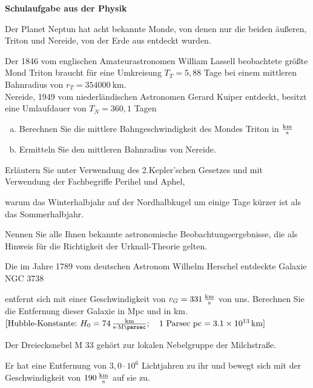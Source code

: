 \documentclass[a4paper]{article}
\begin{document}
{\bf Schulaufgabe aus der Physik }\\
\begin{enumerate}[1.]

{\bf \item Der Planet Neptun hat acht bekannte Monde, von denen nur die beiden äußeren, Triton und Nereide, von der Erde aus entdeckt wurden.} Der 1846 vom englischen Amateurastronomen William Lassell beobachtete größte Mond Triton braucht für eine Umkreisung $T_T=5,88$ Tage bei einem mittleren Bahnradius von $r_T= \SI{354000}{\kilo\meter}$. \\
Nereide, 1949 vom niederländischen Astronomen Gerard Kuiper entdeckt, besitzt eine Umlaufdauer von $T_N=360,1 $ Tagen

\begin{enumerate}[a)]
\item Berechnen Sie die mittlere Bahngeschwindigkeit des Mondes Triton in $\SI{}{\kilo\meter\over \second}$
\item Ermitteln Sie den mittleren Bahnradius von Nereide.
\end{enumerate}

{\bf \item Erläutern Sie unter Verwendung des 2.Kepler'schen Gesetzes und mit Verwendung der Fachbegriffe Perihel und Aphel,}  warum das Winterhalbjahr auf der Nordhalbkugel um einige Tage kürzer ist als das Sommerhalbjahr.

{\bf \item Nennen Sie alle Ihnen bekannte astronomische Beobachtungsergebnisse, die als Hinweis für die Richtigkeit der Urknall-Theorie gelten.}

{\bf \item Die im Jahre 1789 vom deutschen Astronom Wilhelm Herschel entdeckte Galaxie NGC 3738} entfernt sich mit einer Geschwindigkeit von $v_G=\SI{331}{\kilo\meter\over \second}$ von uns. Berechnen Sie die Entfernung dieser Galaxie in Mpc und in km.\\
$[\textnormal{Hubble-Konstante:}~H_0=\SI{74}{\kilo\meter\over \second\cdot\mega\parsec}; \quad 1~\textnormal{Parsec~pc}=\SI{3,1e13}{\kilo\meter}]$

{\bf \item Der Dreiecksnebel M 33 gehört zur lokalen Nebelgruppe der Milchstraße.} Er hat eine Entfernung von $3,0 \cdot 10^6 $ Lichtjahren zu ihr und bewegt sich mit der Geschwindigkeit von $\SI{190}{\kilo\meter\over \second}$ auf sie zu. 


\end{enumerate}
\end{document}
